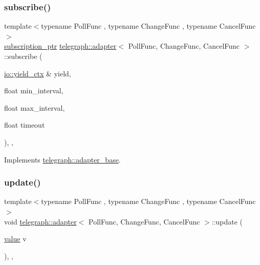 \subsubsection{\texorpdfstring{subscribe()}{subscribe()}}
{\footnotesize\ttfamily template$<$typename Poll\+Func , typename Change\+Func , typename Cancel\+Func $>$ \\
\hyperlink{namespacetelegraph_a58641aa5b1a2cbdb0431916a87069f64}{subscription\+\_\+ptr} \hyperlink{classtelegraph_1_1adapter}{telegraph\+::adapter}$<$ Poll\+Func, Change\+Func, Cancel\+Func $>$\+::subscribe (\begin{DoxyParamCaption}\item[{\hyperlink{structboost_1_1asio_1_1yield__ctx}{io\+::yield\+\_\+ctx} \&}]{yield,  }\item[{float}]{min\+\_\+interval,  }\item[{float}]{max\+\_\+interval,  }\item[{float}]{timeout }\end{DoxyParamCaption})\hspace{0.3cm}{\ttfamily [inline]}, {\ttfamily [override]}, {\ttfamily [virtual]}}



Implements \hyperlink{classtelegraph_1_1adapter__base_a2fa110e124bc9a86c9433fe04033ff06}{telegraph\+::adapter\+\_\+base}.

\mbox{\label{classtelegraph_1_1adapter_aabfebfcdec55822a0a5228277205ab47}} 
\subsubsection{\texorpdfstring{update()}{update()}}
{\footnotesize\ttfamily template$<$typename Poll\+Func , typename Change\+Func , typename Cancel\+Func $>$ \\
void \hyperlink{classtelegraph_1_1adapter}{telegraph\+::adapter}$<$ Poll\+Func, Change\+Func, Cancel\+Func $>$\+::update (\begin{DoxyParamCaption}\item[{\hyperlink{classtelegraph_1_1value}{value}}]{v }\end{DoxyParamCaption})\hspace{0.3cm}{\ttfamily [inline]}, {\ttfamily [override]}, {\ttfamily [virtual]}}



